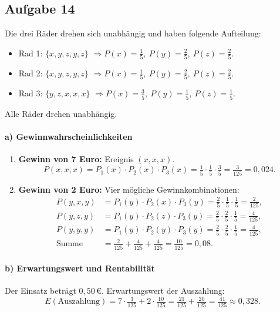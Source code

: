 \documentclass[11pt,a4paper,oneside]{article}
\begin{document}
	
	\newpage
	
	\begin{loesung}{}
		\subsection*{Aufgabe 14}
		Die drei Räder drehen sich unabhängig und haben folgende Aufteilung:
		
		\begin{itemize}
			\item Rad 1: \(\{x,y,z,y,z\}\) \(\Rightarrow P(x)=\tfrac{1}{5},\ P(y)=\tfrac{2}{5},\ P(z)=\tfrac{2}{5}\).
			\item Rad 2: \(\{x,y,z,y,z\}\) \(\Rightarrow P(x)=\tfrac{1}{5},\ P(y)=\tfrac{2}{5},\ P(z)=\tfrac{2}{5}\).
			\item Rad 3: \(\{y,z,x,x,x\}\) \(\Rightarrow P(x)=\tfrac{3}{5},\ P(y)=\tfrac{1}{5},\ P(z)=\tfrac{1}{5}\).
		\end{itemize}
		
		Alle Räder drehen unabhängig.
		
		\paragraph{a) Gewinnwahrscheinlichkeiten}
		\begin{enumerate}
			\item \textbf{Gewinn von 7 Euro:} Ereignis \((x,x,x)\).  
			\[
			P(x,x,x)=P_1(x)\cdot P_2(x)\cdot P_3(x)
			=\tfrac{1}{5}\cdot\tfrac{1}{5}\cdot\tfrac{3}{5}
			=\tfrac{3}{125}=0{,}024.
			\]
			
			\item \textbf{Gewinn von 2 Euro:} Vier mögliche Gewinnkombinationen:
			\begin{align*}
				P(y,x,y)&=P_1(y)\cdot P_2(x)\cdot P_3(y)
				=\tfrac{2}{5}\cdot\tfrac{1}{5}\cdot\tfrac{1}{5}
				=\tfrac{2}{125},\\[6pt]
				P(y,z,y)&=P_1(y)\cdot P_2(z)\cdot P_3(y)
				=\tfrac{2}{5}\cdot\tfrac{2}{5}\cdot\tfrac{1}{5}
				=\tfrac{4}{125},\\[6pt]
				P(y,y,y)&=P_1(y)\cdot P_2(y)\cdot P_3(y)
				=\tfrac{2}{5}\cdot\tfrac{2}{5}\cdot\tfrac{1}{5}
				=\tfrac{4}{125},\\[6pt]
				\text{Summe} &= \tfrac{2}{125}+\tfrac{4}{125}+\tfrac{4}{125}
				=\tfrac{10}{125}=0{,}08.
			\end{align*}
			
		\end{enumerate}
		
		\paragraph{b) Erwartungswert und Rentabilität}
		Der Einsatz beträgt \(0{,}50\,€\). Erwartungswert der Auszahlung:
		\[
		E(\text{Auszahlung})
		=7\cdot \tfrac{3}{125} + 2\cdot \tfrac{10}{125}
		=\tfrac{21}{125}+\tfrac{20}{125}
		=\tfrac{41}{125}\approx 0{,}328.
		\]
		

\end{loesung}
\end{document}
